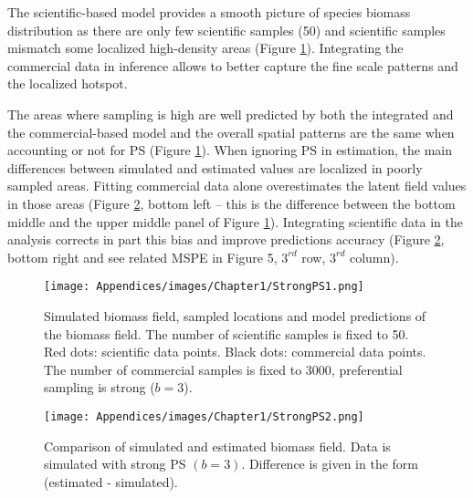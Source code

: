 The scientific-based model provides a smooth picture of species biomass distribution as there are only few scientific samples (50) and scientific samples mismatch some localized high-density areas (Figure \ref{fig:StrongPS1}). Integrating the commercial data in inference allows to better capture the fine scale patterns and the localized hotspot.

The areas where sampling is high are well predicted by both the integrated and the commercial-based model and the overall spatial patterns are the same when accounting or not for PS (Figure \ref{fig:StrongPS1}). When ignoring PS in estimation, the main differences between simulated and estimated values are localized in poorly sampled areas. Fitting commercial data alone overestimates the latent field values in those areas (Figure \ref{fig:StrongPS2}, bottom left – this is the difference between the bottom middle and the upper middle panel of Figure \ref{fig:StrongPS1}). Integrating scientific data in the analysis corrects in part this bias and improve predictions accuracy (Figure \ref{fig:StrongPS2}, bottom right and see related MSPE in Figure 5, \(3^{rd}\) row, \(3^{rd}\) column). 

\newpage

\begin{figure}[H]
   \begin{center}
      \texttt{[image: Appendices/images/Chapter1/StrongPS1.png]}
   \end{center}
   \caption[Simulated biomass field, sampled locations and model predictions of the biomass field.]
   {Simulated biomass field, sampled locations and model predictions of the biomass field. The number of scientific samples is fixed to 50. Red dots: scientific data points. Black dots: commercial data points. The number of commercial samples is fixed to 3000, preferential sampling is strong (\(b=3\)).}
   \label{fig:StrongPS1}
\end{figure}

\begin{figure}[H]
   \begin{center}
      \texttt{[image: Appendices/images/Chapter1/StrongPS2.png]}
   \end{center}
   \caption[Comparison of simulated and estimated biomass field. Data is simulated with strong PS \((b = 3)\).]
   {Comparison of simulated and estimated biomass field. Data is simulated with strong PS \((b = 3)\). Difference is given in the form (estimated - simulated).}
   \label{fig:StrongPS2}
\end{figure}

